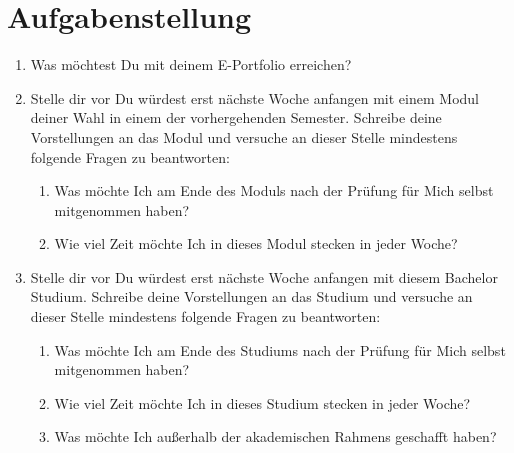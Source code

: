 \documentclass[a4paper,oneside]{scrarticle}
\begin{document}
	\section*{Aufgabenstellung}

	\begin{enumerate}
		\item Was möchtest Du mit deinem E-Portfolio erreichen?
		\item Stelle dir vor Du würdest erst nächste Woche anfangen mit einem Modul deiner Wahl in einem der vorhergehenden Semester. Schreibe deine Vorstellungen an das Modul und versuche an dieser Stelle mindestens folgende Fragen zu beantworten:
		\begin{enumerate}
			\item Was möchte Ich am Ende des Moduls nach der Prüfung für Mich selbst mitgenommen haben?
			\item Wie viel Zeit möchte Ich in dieses Modul stecken in jeder Woche?
		\end{enumerate}
		\item Stelle dir vor Du würdest erst nächste Woche anfangen mit diesem Bachelor Studium. Schreibe deine Vorstellungen an das Studium und versuche an dieser Stelle mindestens folgende Fragen zu beantworten:
		\begin{enumerate}
			\item Was möchte Ich am Ende des Studiums nach der Prüfung für Mich selbst mitgenommen haben?
			\item Wie viel Zeit möchte Ich in dieses Studium stecken in jeder Woche?
			\item Was möchte Ich außerhalb der akademischen Rahmens geschafft haben?
		\end{enumerate}

	\end{enumerate}
\end{document}
